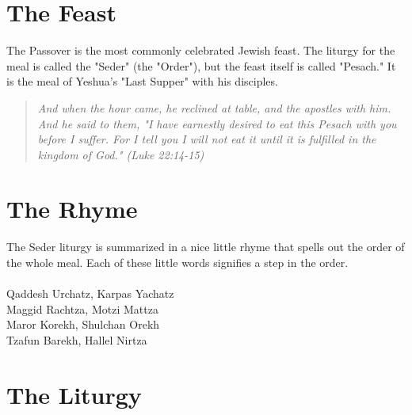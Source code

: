 \documentclass[10pt,oneside,footinclude=true,headinclude=true]{scrbook} %
\newcommand\quot[1]{
	\begin{quote}\textit{\small#1}\end{quote}
}
\begin{document}
\section{The Feast}
The Passover is the most commonly celebrated Jewish feast. The liturgy for the meal is called the "Seder" (the "Order"), but the feast itself is called "Pesach." It is the meal of Yeshua's "Last Supper" with his disciples.

\quot{And when the hour came, he reclined at table, and the apostles with him. And he said to them, "I have earnestly desired to eat this Pesach with you before I suffer. For I tell you I will not eat it until it is fulfilled in the kingdom of God." (Luke 22:14-15)}


\section{The Rhyme}

The Seder liturgy is summarized in a nice little rhyme that spells out the order of the whole meal. Each of these little words signifies a step in the order.\\
\\
Qaddesh Urchatz, Karpas Yachatz\\
Maggid Rachtza, Motzi Mattza\\
Maror Korekh, Shulchan Orekh\\
Tzafun Barekh, Hallel Nirtza


\section{The Liturgy}
\end{document}
